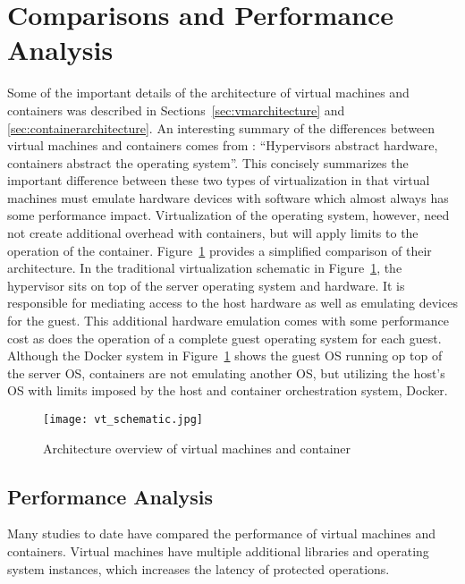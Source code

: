 \section{Comparisons and Performance Analysis} %
\label{sec:comparisons_performance_analysis}
Some of the important details of the architecture of virtual machines and containers was described in Sections~\ref{sec:vmarchitecture} and \ref{sec:containerarchitecture}.
An interesting summary of the differences between virtual machines and containers comes from \autocite{morabitohypervisors}: ``Hypervisors abstract hardware, containers abstract the operating system''. 
This concisely summarizes the important difference between these two types of virtualization in that virtual machines must emulate hardware devices with software which almost always has some performance impact.  
Virtualization of the operating system, however, need not create additional overhead with containers, but will apply limits to the operation of the container. 
Figure~\ref{fig:vtschematic} provides a simplified comparison of their architecture. 
In the traditional virtualization schematic in Figure~\ref{fig:vtschematic}, the hypervisor sits on top of the server operating system and hardware.
It is responsible for mediating access to the host hardware as well as emulating devices for the guest.  
This additional hardware emulation comes with some performance cost as does the operation of a complete guest operating system for each guest.  
Although the Docker system in Figure~\ref{fig:vtschematic} shows the guest OS running op top of the server OS, containers are not emulating another OS, but utilizing the host's OS with limits imposed by the host and container orchestration system, Docker.

\begin{figure}
    \centering
    \texttt{[image: vt\_schematic.jpg]}
    \caption{Architecture overview of virtual machines and container}
    \label{fig:vtschematic}
\end{figure}

\subsection{Performance Analysis} %
\label{sub:performanceanalysis}

Many studies to date have compared the performance of virtual machines and containers.
Virtual machines have multiple additional libraries and operating system instances, which increases the latency of protected operations.  

